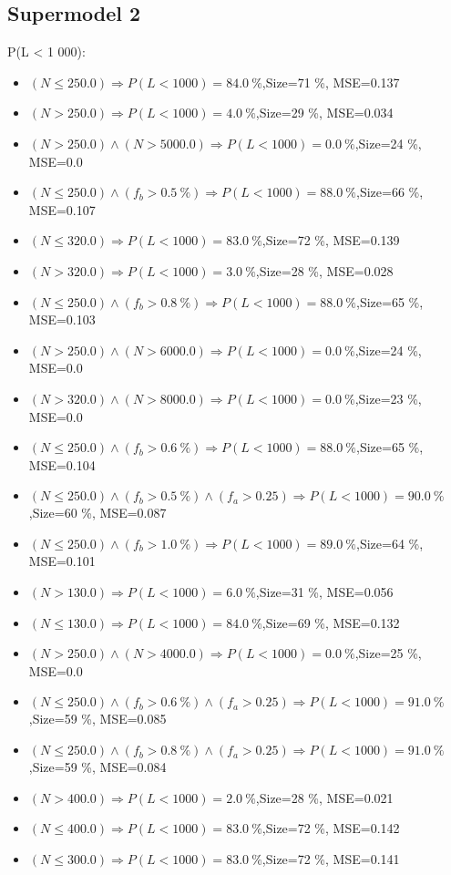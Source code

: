 \documentclass[numbered]{CSL}
\begin{document}
\subsection{Supermodel 2}
P(L < 1 000):
\begin{itemize}
\item $(N \leq 250.0) \Rightarrow P(L < 1 000) = 84.0~\%$,\hfill Size=71 \%, MSE=0.137
\item $(N > 250.0) \Rightarrow P(L < 1 000) = 4.0~\%$,\hfill Size=29 \%, MSE=0.034
\item $(N > 250.0) \land (N > 5000.0) \Rightarrow P(L < 1 000) = 0.0~\%$,\hfill Size=24 \%, MSE=0.0
\item $(N \leq 250.0) \land (f_b > 0.5~\%) \Rightarrow P(L < 1 000) = 88.0~\%$,\hfill Size=66 \%, MSE=0.107
\item $(N \leq 320.0) \Rightarrow P(L < 1 000) = 83.0~\%$,\hfill Size=72 \%, MSE=0.139
\item $(N > 320.0) \Rightarrow P(L < 1 000) = 3.0~\%$,\hfill Size=28 \%, MSE=0.028
\item $(N \leq 250.0) \land (f_b > 0.8~\%) \Rightarrow P(L < 1 000) = 88.0~\%$,\hfill Size=65 \%, MSE=0.103
\item $(N > 250.0) \land (N > 6000.0) \Rightarrow P(L < 1 000) = 0.0~\%$,\hfill Size=24 \%, MSE=0.0
\item $(N > 320.0) \land (N > 8000.0) \Rightarrow P(L < 1 000) = 0.0~\%$,\hfill Size=23 \%, MSE=0.0
\item $(N \leq 250.0) \land (f_b > 0.6~\%) \Rightarrow P(L < 1 000) = 88.0~\%$,\hfill Size=65 \%, MSE=0.104
\item $(N \leq 250.0) \land (f_b > 0.5~\%) \land (f_a > 0.25) \Rightarrow P(L < 1 000) = 90.0~\%$,\hfill Size=60 \%, MSE=0.087
\item $(N \leq 250.0) \land (f_b > 1.0~\%) \Rightarrow P(L < 1 000) = 89.0~\%$,\hfill Size=64 \%, MSE=0.101
\item $(N > 130.0) \Rightarrow P(L < 1 000) = 6.0~\%$,\hfill Size=31 \%, MSE=0.056
\item $(N \leq 130.0) \Rightarrow P(L < 1 000) = 84.0~\%$,\hfill Size=69 \%, MSE=0.132
\item $(N > 250.0) \land (N > 4000.0) \Rightarrow P(L < 1 000) = 0.0~\%$,\hfill Size=25 \%, MSE=0.0
\item $(N \leq 250.0) \land (f_b > 0.6~\%) \land (f_a > 0.25) \Rightarrow P(L < 1 000) = 91.0~\%$,\hfill Size=59 \%, MSE=0.085
\item $(N \leq 250.0) \land (f_b > 0.8~\%) \land (f_a > 0.25) \Rightarrow P(L < 1 000) = 91.0~\%$,\hfill Size=59 \%, MSE=0.084
\item $(N > 400.0) \Rightarrow P(L < 1 000) = 2.0~\%$,\hfill Size=28 \%, MSE=0.021
\item $(N \leq 400.0) \Rightarrow P(L < 1 000) = 83.0~\%$,\hfill Size=72 \%, MSE=0.142
\item $(N \leq 300.0) \Rightarrow P(L < 1 000) = 83.0~\%$,\hfill Size=72 \%, MSE=0.141
\end{itemize}
\end{document}
